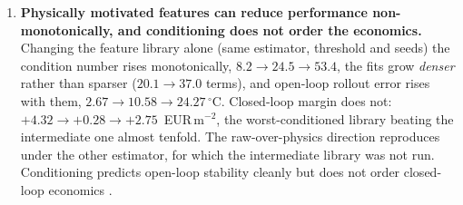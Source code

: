 \begin{enumerate}
\item \textbf{Physically motivated features can reduce performance non-monotonically,
and conditioning does not order the economics.} Changing the feature library alone (same estimator, threshold and seeds) the condition number rises
monotonically, $8.2 \rightarrow 24.5 \rightarrow 53.4$, the fits grow
\emph{denser} rather than sparser ($20.1 \rightarrow 37.0$ terms), and open-loop
rollout error rises with them, $2.67 \rightarrow 10.58 \rightarrow
24.27\,^\circ$C. Closed-loop margin does not: $+4.32 \rightarrow +0.28
\rightarrow +2.75$~EUR\,m$^{-2}$, the worst-conditioned library beating the
intermediate one almost tenfold. The raw-over-physics direction reproduces under the
other estimator, for which the intermediate library was not run.
Conditioning predicts open-loop stability cleanly but does not order closed-loop
economics \cite{cortiella2021,balanceguided2026,belsley1980}.


\end{enumerate}
